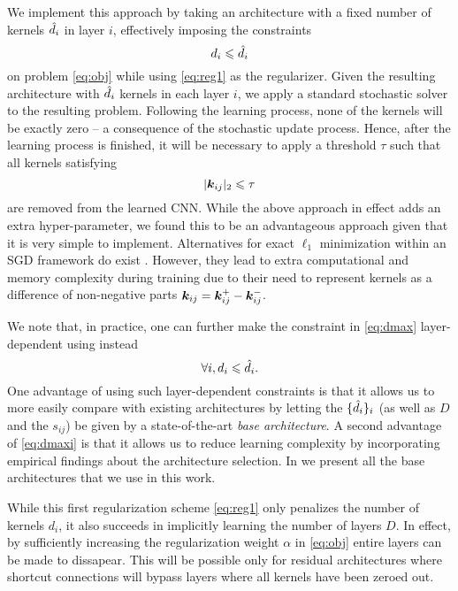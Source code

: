 We implement this approach by taking an architecture with a fixed number of kernels $\hat{d}_i$ in layer $i$, effectively imposing the constraints
\begin{equation}\label{eq:dmax}
d_{i} \leqslant \hat{d}_i
\end{equation}
on problem \eqref{eq:obj} while using \eqref{eq:reg1} as the regularizer. Given the resulting architecture with $\hat{d}_i$ kernels in each layer $i$, we apply a standard stochastic solver to the resulting problem. Following the learning process, none of the kernels will be exactly zero -- a consequence of the stochastic update process. Hence, after the learning process is finished, it will be necessary to apply a threshold $\tau$ such that all kernels satisfying
\begin{equation}
|\bm{k}_{ij}|_2 \leqslant \tau
\end{equation}
are removed from the learned CNN.   While the above approach in effect adds an extra hyper-parameter, we found this to be an advantageous approach given that it is very simple to implement. Alternatives for exact $\ell_1$ minimization within an SGD framework do exist \cite{Bottou2012,Kulkarnia}. However, they lead to extra computational and memory complexity during training due to their need to represent kernels as a difference of non-negative parts $\bm{k}_{ij} =\bm{k}_{ij}^+ - \bm{k}_{ij}^-$. 



We note that, in practice, one can further make the constraint in \eqref{eq:dmax} layer-dependent using instead
\begin{equation}\label{eq:dmaxi}
\forall i,  d_{i} \leqslant \hat{d}_i.
\end{equation}
One advantage of using such layer-dependent constraints is that it allows us to more easily compare with existing architectures by letting the $\{\hat{d}_i\}_i$ (as well as $D$ and the $s_{ij}$) be given by a state-of-the-art \emph{base architecture}.  A second advantage of \eqref{eq:dmaxi} is that it allows us to reduce learning complexity by incorporating empirical findings about the architecture selection. In  we present all the base architectures that we use in this work.

While this first regularization scheme \eqref{eq:reg1} only penalizes the number of kernels $d_i$, it also succeeds in implicitly learning the number of layers $D$. In effect, by sufficiently increasing the regularization weight $\alpha$ in \eqref{eq:obj} entire layers can be made to dissapear. This will be possible only for residual architectures where shortcut connections will bypass layers where all kernels have been zeroed out. 

